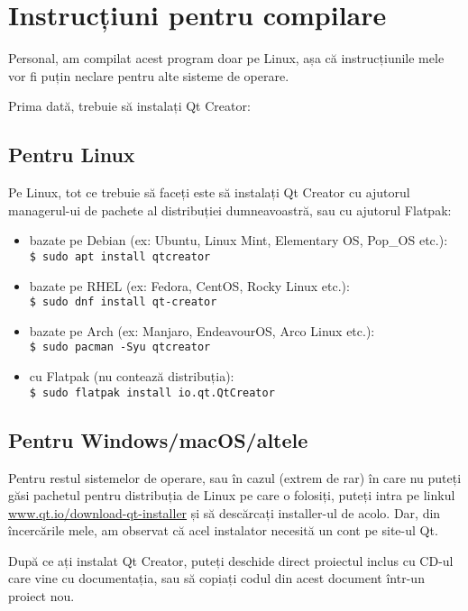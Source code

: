 \section{Instrucțiuni pentru compilare}
Personal, am compilat acest program doar pe Linux, așa că instrucțiunile mele vor fi puțin neclare pentru alte sisteme de operare.

Prima dată, trebuie să instalați Qt Creator:

\subsection{Pentru Linux}
Pe Linux, tot ce trebuie să faceți este să instalați Qt Creator cu ajutorul managerul-ui de pachete al distribuției dumneavoastră, sau cu ajutorul Flatpak:
\begin{itemize}
 \item bazate pe Debian (ex: Ubuntu, Linux Mint, Elementary OS, Pop\_OS etc.):\\
  \texttt{\$ sudo apt install qtcreator}
 \item bazate pe RHEL (ex: Fedora, CentOS, Rocky Linux etc.):\\
  \texttt{\$ sudo dnf install qt-creator}
 \item bazate pe Arch (ex: Manjaro, EndeavourOS, Arco Linux etc.):\\
  \texttt{\$ sudo pacman -Syu qtcreator}
 \item cu Flatpak (nu contează distribuția):\\
  \texttt{\$ sudo flatpak install io.qt.QtCreator}
\end{itemize}

\subsection{Pentru Windows/macOS/altele}
Pentru restul sistemelor de operare, sau în cazul (extrem de rar) în care nu puteți găsi pachetul pentru distribuția de Linux pe care o folosiți, puteți intra pe linkul \url{www.qt.io/download-qt-installer} și să descărcați installer-ul de acolo. Dar, din încercările mele, am observat că acel instalator necesită un cont pe site-ul Qt.

\vspace*{1cm}

După ce ați instalat Qt Creator, puteți deschide direct proiectul inclus cu CD-ul care vine cu documentația, sau să copiați codul din acest document într-un proiect nou.
